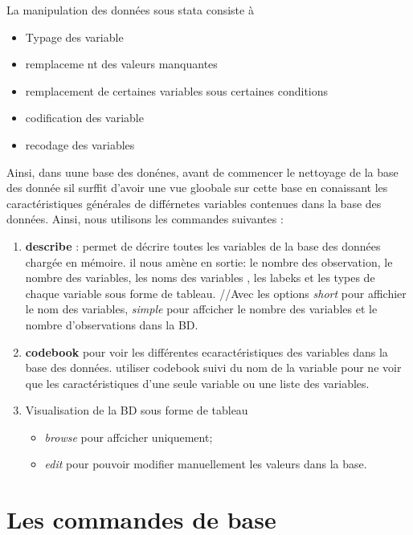 \documentclass[
]{book}
\providecommand{\tightlist}{%
  \setlength{\itemsep}{0pt}\setlength{\parskip}{0pt}}
\theoremstyle{definition}
\theoremstyle{definition}
\theoremstyle{definition}
\theoremstyle{definition}
\theoremstyle{remark}
\begin{document}
La manipulation des données sous stata consiste à

\begin{itemize}
\tightlist
\item
  Typage des variable
\item
  remplaceme nt des valeurs manquantes
\item
  remplacement de certaines variables sous certaines conditions
\item
  codification des variable
\item
  recodage des variables
\end{itemize}

Ainsi, dans uune base des donénes, avant de commencer le nettoyage de la base des donnée sil surffit d'avoir une vue gloobale sur cette base en conaissant les caractéristiques générales de différnetes variables contenues dans la base des données.
Ainsi, nous utilisons les commandes suivantes :

\begin{enumerate}
\def\labelenumi{(\arabic{enumi})}
\tightlist
\item
  \textbf{describe} : permet de décrire toutes les variables de la base des données chargée en mémoire. il nous amène en sortie: le nombre des observation, le nombre des variables, les noms des variables , les labeks et les types de chaque variable sous forme de tableau. //Avec les options \emph{short} pour affichier le nom des variables, \emph{simple} pour affcicher le nombre des variables et le nombre d'observations dans la BD.
\item
  \textbf{codebook} pour voir les différentes ecaractéristiques des variables dans la base des données. utiliser codebook suivi du nom de la variable pour ne voir que les caractéristiques d'une seule variable ou une liste des variables.
\item
  Visualisation de la BD sous forme de tableau

  \begin{itemize}
  \tightlist
  \item
    \emph{browse} pour affcicher uniquement;
  \item
    \emph{edit} pour pouvoir modifier manuellement les valeurs dans la base.
  \end{itemize}
\end{enumerate}

\hypertarget{les-commandes-de-base}{%
\section{Les commandes de base}\label{les-commandes-de-base}}
\end{document}
